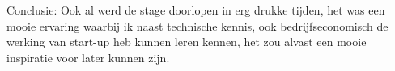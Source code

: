 \documentclass[a4paper,11pt]{article}
\theoremstyle{definition}
\begin{document}
\noindent Conclusie: Ook al werd de stage doorlopen in erg drukke tijden, het was een 
mooie ervaring waarbij ik naast technische kennis, ook bedrijfseconomisch de 
werking van start-up heb kunnen leren kennen, het zou alvast een mooie inspiratie voor later kunnen zijn.

\noindent 




 
\end{document}
